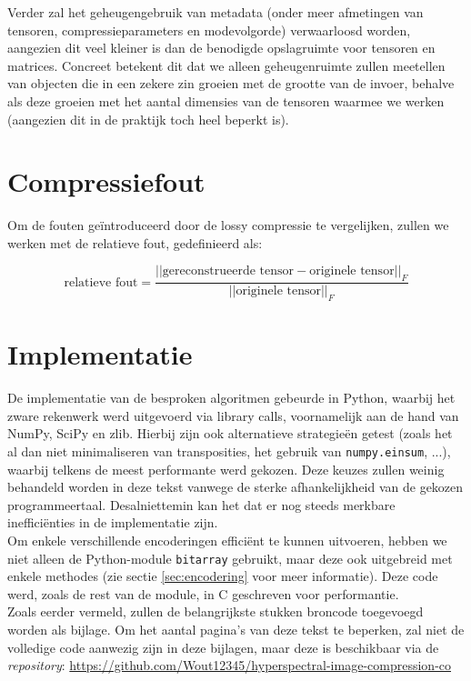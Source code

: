 Verder zal het geheugengebruik van metadata (onder meer afmetingen van tensoren, compressieparameters en modevolgorde) verwaarloosd worden, aangezien dit veel kleiner is dan de benodigde opslagruimte voor tensoren en matrices. Concreet betekent dit dat we alleen geheugenruimte zullen meetellen van objecten die in een zekere zin groeien met de grootte van de invoer, behalve als deze groeien met het aantal dimensies van de tensoren waarmee we werken (aangezien dit in de praktijk toch heel beperkt is).

\section{Compressiefout}

Om de fouten ge\"introduceerd door de lossy compressie te vergelijken, zullen we werken met de relatieve fout, gedefinieerd als:

\[
\text{relatieve fout} = \frac{||\text{gereconstrueerde tensor} - \text{originele tensor}||_F}{||\text{originele tensor}||_F}
\]

\section{Implementatie}

De implementatie van de besproken algoritmen gebeurde in Python, waarbij het zware rekenwerk werd uitgevoerd via library calls, voornamelijk aan de hand van NumPy, SciPy en zlib. Hierbij zijn ook alternatieve strategie\"en getest (zoals het al dan niet minimaliseren van transposities, het gebruik van \texttt{numpy.einsum}, ...), waarbij telkens de meest performante werd gekozen. Deze keuzes zullen weinig behandeld worden in deze tekst vanwege de sterke afhankelijkheid van de gekozen programmeertaal. Desalniettemin kan het dat er nog steeds merkbare ineffici\"enties in de implementatie zijn.\\

Om enkele verschillende encoderingen effici\"ent te kunnen uitvoeren, hebben we niet alleen de Python-module \texttt{bitarray} \cite{ref:bitarray} gebruikt, maar deze ook uitgebreid met enkele methodes (zie sectie \ref{sec:encodering} voor meer informatie). Deze code werd, zoals de rest van de module, in C geschreven voor performantie.\\

Zoals eerder vermeld, zullen de belangrijkste stukken broncode toegevoegd worden als bijlage. Om het aantal pagina's van deze tekst te beperken, zal niet de volledige code aanwezig zijn in deze bijlagen, maar deze is beschikbaar via de \textit{repository}: \url{https://github.com/Wout12345/hyperspectral-image-compression-co}

